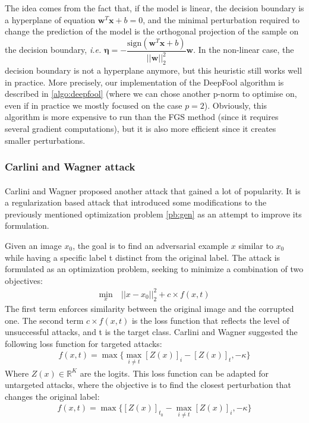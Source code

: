 \documentclass[11pt,twocolumn,letterpaper]{article}
\begin{document}
The idea comes from the fact that, if the model is linear, the decision boundary is a hyperplane of equation $\bm{w}^T\bm{x} + b = 0$, and the minimal perturbation required to change the prediction of the model is the orthogonal projection of the sample on the decision boundary, \textit{i.e.} $\bm{\eta} = - \dfrac{\text{sign}(\bm{w}^T\bm{x} + b)}{||\bm{w}||_2^2} \bm{w}$. In the non-linear case, the decision boundary is not a hyperplane anymore, but this heuristic still works well in practice. More precisely, our implementation of the DeepFool algorithm is described in \ref{algo:deepfool} (where we can chose another p-norm to optimise on, even if in practice we mostly focused on the case $p=2$).
Obviously, this algorithm is more expensive to run than the FGS method (since it requires several gradient computations), but it is also more efficient since it creates smaller perturbations.

\subsubsection{Carlini and Wagner attack}
\paragraph{}
Carlini and Wagner proposed another attack \cite{robustness} that gained a lot of popularity. It is a regularization based attack that introduced some modifications to the previously mentioned optimization problem \ref{pb:gen} as an attempt to improve its formulation.

Given an image $x_0$, the goal is to find an adversarial example $x$ similar to $x_0$ while having a specific label t distinct from the original label. The attack is formulated as an optimization problem, seeking to minimize a combination of two objectives:
\begin{align*}
   \min_x &\ ||x - x_0||_2^2 + c \times f(x,t) %
\end{align*}
The first term enforces similarity between the original image and the corrupted one. The second term $ c \times f(x,t) $ is the loss function that reflects the level of unsuccessful attacks, and t is the target class. Carlini and Wagner suggested the following loss function for targeted attacks:
\begin{align*}
    f(x,t) = \max \{ \max_{i \neq t}[Z(x)]_i - [Z(x)]_t, -\kappa \}
\end{align*}
Where $Z(x) \in \mathbb{R}^K$ are the logits. 
This loss function can be adapted for untargeted attacks, where the objective is to find the closest perturbation that changes the original label:
\begin{align*}
    f(x,t) = \max \{[Z(x)]_{t_0} - \max_{i \neq t}[Z(x)]_i, -\kappa \}
\end{align*}
\end{document}

